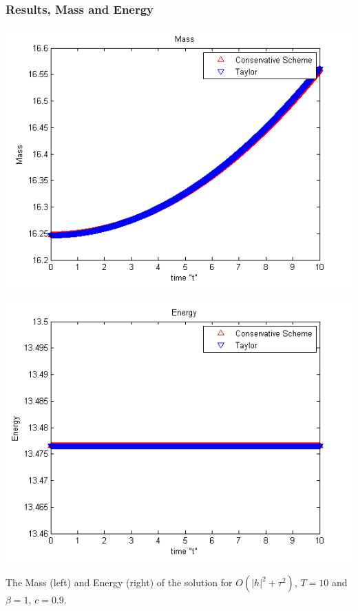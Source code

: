 \documentclass{beamer}
\begin{document}
\begin{frame}
\frametitle{Results, Mass and Energy}

\begin{center}\vspace{0.4cm}
	\begin{minipage}[b]{0.45\linewidth}
		 \includegraphics[width=\linewidth]{figures/Mass_bt1_c090_h010.png}
	\end{minipage}	
	\begin{minipage}[b]{0.45\linewidth}
		\includegraphics[width=\linewidth]{figures/Energy_bt1_c090_h010.png}
		
	\end{minipage}

\end{center}
The Mass (left) and Energy (right) of the solution for $O(|h|^2 + \tau^2)$, $T = 10$ and $\beta=1$, $c = 0.9$.
\end{frame}
\end{document}
